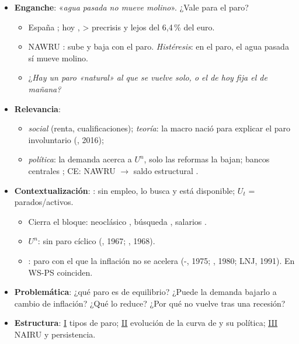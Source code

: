 \documentclass{article}
\begin{document}
\cabecerarepaso
\begin{columnas}

\begin{itemize}
\item \textbf{Enganche}: «\emph{agua pasada no mueve molino}». ¿Vale para el paro?
  \begin{itemize}
  \item España ; hoy , > precrisis y lejos del 6,4\,\% del euro.
  \item NAWRU : sube y baja con el paro. \emph{Histéresis}: en el paro, el agua pasada sí mueve molino.
  \item ¿\emph{Hay un paro «natural» al que se vuelve solo, o el de hoy fija el de mañana?}
  \end{itemize}
\item \textbf{Relevancia}:
  \begin{itemize}
  \item \emph{social} (renta, cualificaciones); \emph{teoría}: la macro nació para explicar el paro involuntario (, 2016);
  \item \emph{política}: la demanda acerca a $U^n$, solo las reformas la bajan; bancos centrales ; CE: NAWRU $\to$ saldo estructural .
  \end{itemize}
\item \textbf{Contextualización}: : sin empleo, lo busca y está disponible; $U_t$ = parados/activos.
  \begin{itemize}
  \item Cierra el bloque: neoclásico , búsqueda , salarios .
  \item {} $U^n$: sin paro cíclico (, 1967; , 1968).
  \item {}: paro con el que la inflación no se acelera (-, 1975; , 1980; LNJ, 1991). En WS-PS coinciden.
  \end{itemize}
\item \textbf{Problemática}: ¿qué paro es de equilibrio? ¿Puede la demanda bajarlo a cambio de inflación? ¿Qué lo reduce? ¿Por qué no vuelve tras una recesión?
\item \textbf{Estructura}: \hyperref[rep:I]{I} tipos de paro; \hyperref[rep:II]{II} evolución de la curva de  y su política; \hyperref[rep:III]{III} NAIRU y persistencia.

\end{itemize}
\end{columnas}
\end{document}
